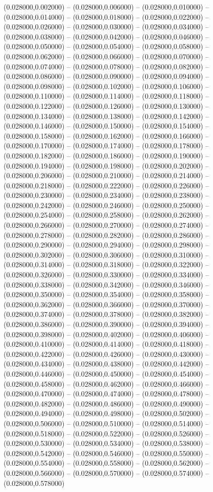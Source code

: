    (0.028000,0.002000) -- (0.028000,0.006000) -- (0.028000,0.010000) -- (0.028000,0.014000) -- (0.028000,0.018000) -- (0.028000,0.022000) -- (0.028000,0.026000) -- (0.028000,0.030000) -- (0.028000,0.034000) -- (0.028000,0.038000) -- (0.028000,0.042000) -- (0.028000,0.046000) -- (0.028000,0.050000) -- (0.028000,0.054000) -- (0.028000,0.058000) -- (0.028000,0.062000) -- (0.028000,0.066000) -- (0.028000,0.070000) -- (0.028000,0.074000) -- (0.028000,0.078000) -- (0.028000,0.082000) -- (0.028000,0.086000) -- (0.028000,0.090000) -- (0.028000,0.094000) -- (0.028000,0.098000) -- (0.028000,0.102000) -- (0.028000,0.106000) -- (0.028000,0.110000) -- (0.028000,0.114000) -- (0.028000,0.118000) -- (0.028000,0.122000) -- (0.028000,0.126000) -- (0.028000,0.130000) -- (0.028000,0.134000) -- (0.028000,0.138000) -- (0.028000,0.142000) -- (0.028000,0.146000) -- (0.028000,0.150000) -- (0.028000,0.154000) -- (0.028000,0.158000) -- (0.028000,0.162000) -- (0.028000,0.166000) -- (0.028000,0.170000) -- (0.028000,0.174000) -- (0.028000,0.178000) -- (0.028000,0.182000) -- (0.028000,0.186000) -- (0.028000,0.190000) -- (0.028000,0.194000) -- (0.028000,0.198000) -- (0.028000,0.202000) -- (0.028000,0.206000) -- (0.028000,0.210000) -- (0.028000,0.214000) -- (0.028000,0.218000) -- (0.028000,0.222000) -- (0.028000,0.226000) -- (0.028000,0.230000) -- (0.028000,0.234000) -- (0.028000,0.238000) -- (0.028000,0.242000) -- (0.028000,0.246000) -- (0.028000,0.250000) -- (0.028000,0.254000) -- (0.028000,0.258000) -- (0.028000,0.262000) -- (0.028000,0.266000) -- (0.028000,0.270000) -- (0.028000,0.274000) -- (0.028000,0.278000) -- (0.028000,0.282000) -- (0.028000,0.286000) -- (0.028000,0.290000) -- (0.028000,0.294000) -- (0.028000,0.298000) -- (0.028000,0.302000) -- (0.028000,0.306000) -- (0.028000,0.310000) -- (0.028000,0.314000) -- (0.028000,0.318000) -- (0.028000,0.322000) -- (0.028000,0.326000) -- (0.028000,0.330000) -- (0.028000,0.334000) -- (0.028000,0.338000) -- (0.028000,0.342000) -- (0.028000,0.346000) -- (0.028000,0.350000) -- (0.028000,0.354000) -- (0.028000,0.358000) -- (0.028000,0.362000) -- (0.028000,0.366000) -- (0.028000,0.370000) -- (0.028000,0.374000) -- (0.028000,0.378000) -- (0.028000,0.382000) -- (0.028000,0.386000) -- (0.028000,0.390000) -- (0.028000,0.394000) -- (0.028000,0.398000) -- (0.028000,0.402000) -- (0.028000,0.406000) -- (0.028000,0.410000) -- (0.028000,0.414000) -- (0.028000,0.418000) -- (0.028000,0.422000) -- (0.028000,0.426000) -- (0.028000,0.430000) -- (0.028000,0.434000) -- (0.028000,0.438000) -- (0.028000,0.442000) -- (0.028000,0.446000) -- (0.028000,0.450000) -- (0.028000,0.454000) -- (0.028000,0.458000) -- (0.028000,0.462000) -- (0.028000,0.466000) -- (0.028000,0.470000) -- (0.028000,0.474000) -- (0.028000,0.478000) -- (0.028000,0.482000) -- (0.028000,0.486000) -- (0.028000,0.490000) -- (0.028000,0.494000) -- (0.028000,0.498000) -- (0.028000,0.502000) -- (0.028000,0.506000) -- (0.028000,0.510000) -- (0.028000,0.514000) -- (0.028000,0.518000) -- (0.028000,0.522000) -- (0.028000,0.526000) -- (0.028000,0.530000) -- (0.028000,0.534000) -- (0.028000,0.538000) -- (0.028000,0.542000) -- (0.028000,0.546000) -- (0.028000,0.550000) -- (0.028000,0.554000) -- (0.028000,0.558000) -- (0.028000,0.562000) -- (0.028000,0.566000) -- (0.028000,0.570000) -- (0.028000,0.574000) -- (0.028000,0.578000) 